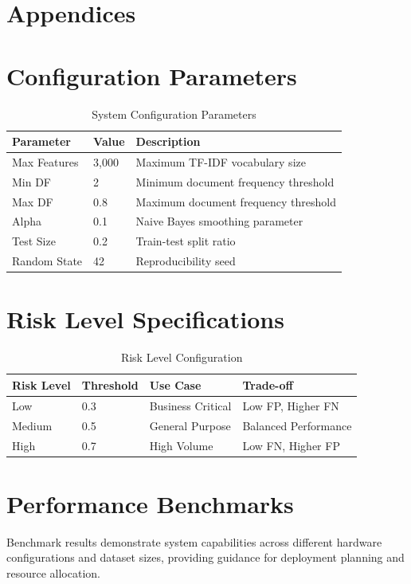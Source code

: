 \documentclass[12pt,a4paper]{article}
\begin{document}
\section{Appendices}

\appendix

\section{Configuration Parameters}

\begin{table}[H]
\centering
\caption{System Configuration Parameters}
\begin{tabular}{@{}lll@{}}
\toprule
\textbf{Parameter} & \textbf{Value} & \textbf{Description} \\
\midrule
Max Features & 3,000 & Maximum TF-IDF vocabulary size \\
Min DF & 2 & Minimum document frequency threshold \\
Max DF & 0.8 & Maximum document frequency threshold \\
Alpha & 0.1 & Naive Bayes smoothing parameter \\
Test Size & 0.2 & Train-test split ratio \\
Random State & 42 & Reproducibility seed \\
\bottomrule
\end{tabular}
\end{table}

\section{Risk Level Specifications}

\begin{table}[H]
\centering
\caption{Risk Level Configuration}
\begin{tabular}{@{}llll@{}}
\toprule
\textbf{Risk Level} & \textbf{Threshold} & \textbf{Use Case} & \textbf{Trade-off} \\
\midrule
Low & 0.3 & Business Critical & Low FP, Higher FN \\
Medium & 0.5 & General Purpose & Balanced Performance \\
High & 0.7 & High Volume & Low FN, Higher FP \\
\bottomrule
\end{tabular}
\end{table}

\section{Performance Benchmarks}

Benchmark results demonstrate system capabilities across different hardware configurations and dataset sizes, providing guidance for deployment planning and resource allocation.




\end{document}
